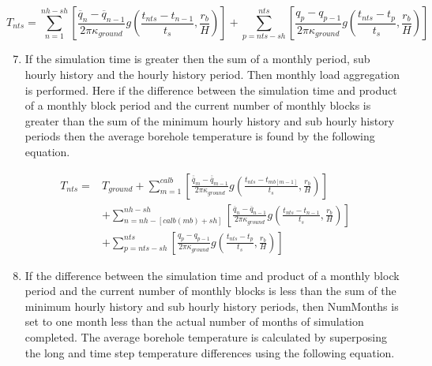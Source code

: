 \begin{equation}
{T_{nts}} = \sum\limits_{n = 1}^{nh - sh} {\left[ {\frac{{{{\overline q }_n} - {{\overline q }_{n - 1}}}}{{2\pi {\kappa_{ground}}}}g\left( {\frac{{{t_{nts}} - {t_{n - 1}}}}{{{t_s}}},\frac{{{r_b}}}{H}} \right)} \right]}  + \sum\limits_{p = nts - sh}^{nts} {\left[ {\frac{{{q_p} - {q_{p - 1}}}}{{2\pi {\kappa_{ground}}}}g\left( {\frac{{{t_{nts}} - {t_p}}}{{{t_s}}},\frac{{{r_b}}}{H}} \right)} \right]}
\label{eq:Tnts606}
\end{equation}

\begin{enumerate}
\setcounter{enumi}{6}
\item If the simulation time is greater then the sum of a monthly period, sub hourly history and the hourly history period. Then monthly load aggregation is performed. Here if the difference between the simulation time and product of a monthly block period and the current number of monthly blocks is greater than the sum of the minimum hourly history and sub hourly history periods then the average borehole temperature is found by the following equation.
\end{enumerate}

\begin{equation}
\begin{array}{rl}
T_{nts} =& T_{ground} + \sum\limits_{m=1}^{calb} \left[ \frac{\overline{\overline q}_m - \overline{\overline q}_{m - 1}}{2\pi \kappa_{ground}} g \left( \frac{t_{nts} - t_{mb[m - 1]}}{t_s},\frac{r_b}{H} \right) \right] \\
 & + \sum\limits_{n = nh - [calb(mb) + sh]}^{nh - sh} {\left[ {\frac{{{{\overline q }_n} - {{\overline q }_{n - 1}}}}{{2\pi {\kappa_{ground}}}}g\left( {\frac{{{t_{nts}} - {t_{n - 1}}}}{{{t_s}}},\frac{{{r_b}}}{H}} \right)} \right]} \\
 & + \sum\limits_{p = nts - sh}^{nts} {\left[ {\frac{{{q_p} - {q_{p - 1}}}}{{2\pi {\kappa_{ground}}}}g\left( {\frac{{{t_{nts}} - {t_p}}}{{{t_s}}},\frac{{{r_b}}}{H}} \right)} \right]}
\end{array}
\label{eq:Tnts607}
\end{equation}

\begin{enumerate}
\setcounter{enumi}{7}
\item If the difference between the simulation time and product of a monthly block period and the current number of monthly blocks is less than the sum of the minimum hourly history and sub hourly history periods, then NumMonths is set to one month less than the actual number of months of simulation completed. The average borehole temperature is calculated by superposing the long and time step temperature differences using the following equation.
\end{enumerate}

